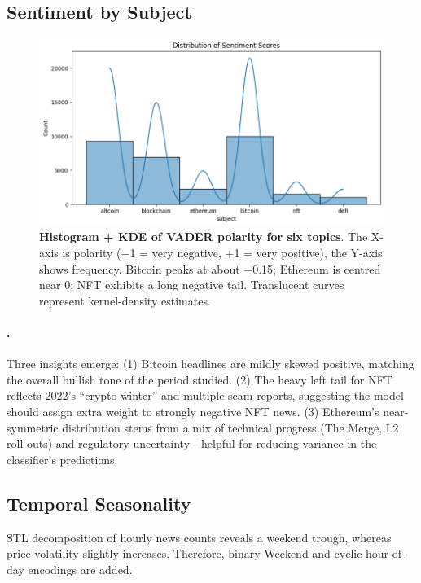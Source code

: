 \documentclass[12pt,a4paper]{article}
\begin{document}
\subsection{Sentiment by Subject}
\begin{figure}[H]
  \centering
  \includegraphics[width=.9\linewidth]{output2.png}
  \caption{\textbf{Histogram + KDE of VADER polarity for six topics}.  
  The X-axis is polarity (−1 = very negative, +1 = very positive),
  the Y-axis shows frequency.  Bitcoin peaks at about +0.15; Ethereum
  is centred near 0; NFT exhibits a long negative tail.  Translucent
  curves represent kernel-density estimates.}
  \label{fig:sentiment}
\end{figure}

\paragraph{.}
Three insights emerge:  
(1) Bitcoin headlines are mildly skewed positive, matching the overall
bullish tone of the period studied.  
(2) The heavy left tail for NFT reflects 2022’s “crypto winter” and
multiple scam reports, suggesting the model should assign extra weight
to strongly negative NFT news.  
(3) Ethereum’s near-symmetric distribution stems from a mix of
technical progress (The Merge, L2 roll-outs) and regulatory
uncertainty—helpful for reducing variance in the classifier’s
predictions.


\subsection{Temporal Seasonality}
STL decomposition of hourly news counts reveals a weekend trough,
whereas price volatility slightly increases.  Therefore, binary
\textsf{Weekend} and cyclic hour-of-day encodings are added.

\end{document}
